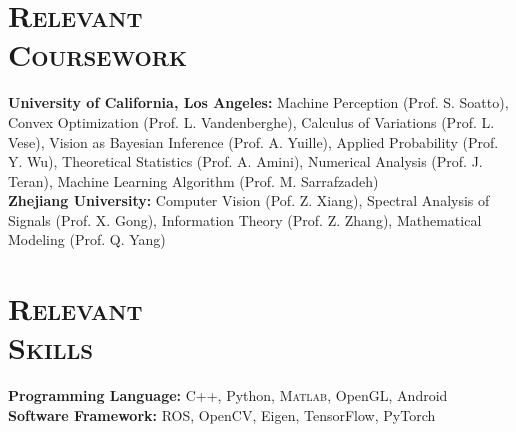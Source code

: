 \documentclass[margin, line, 10pt]{res} %
\begin{document}
\begin{resume}
\section{\textsc{Relevant\\Coursework}}
\textbf{University of California, Los Angeles:} Machine Perception (Prof. S. Soatto), Convex Optimization (Prof. L. Vandenberghe), Calculus of Variations (Prof. L. Vese), Vision as Bayesian Inference (Prof. A. Yuille), Applied Probability (Prof. Y. Wu), Theoretical Statistics (Prof. A. Amini), Numerical Analysis (Prof. J. Teran), Machine Learning Algorithm (Prof. M. Sarrafzadeh)\\
\textbf{Zhejiang University:} Computer Vision (Pof. Z. Xiang), Spectral Analysis of Signals (Prof. X. Gong), Information Theory (Prof. Z. Zhang), Mathematical Modeling (Prof. Q. Yang)

\section{\textsc{Relevant\\Skills}}
\textbf{Programming Language:} C++, Python, \textsc{Matlab}, OpenGL, Android\\
\textbf{Software Framework:} ROS, OpenCV, Eigen, TensorFlow, PyTorch


\end{resume}
\end{document}
